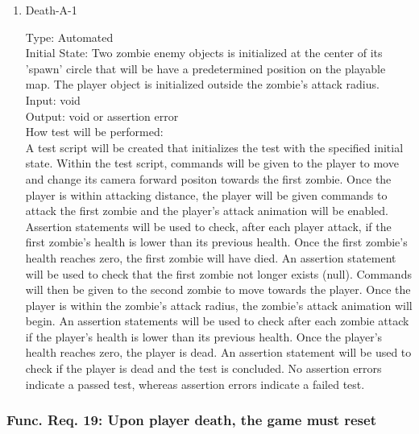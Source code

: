 \documentclass[12pt, titlepage]{article}
\begin{document}
\begin{enumerate}

\item{Death-A-1\\}

Type: Automated \\
					
Initial State: Two zombie enemy objects is initialized at the center of its 'spawn' circle that will be have a predetermined position on the playable map. The player object is initialized outside the zombie's attack radius.\\
					
Input: void \\
					
Output: void or assertion error \\
					
How test will be performed:\\  A test script will be created that initializes the test with the specified initial state. Within the test script, commands will be given to the player to move and change its camera forward positon towards the first zombie. Once the player is within attacking distance, the player will be given commands to attack the first zombie and the player's attack animation will be enabled. Assertion statements will be used to check, after each player attack, if the first zombie's health is lower than its previous health. Once the first zombie's health reaches zero, the first zombie will have died. An assertion statement will be used to check that the first zombie not longer exists (null). Commands will then be given to the second zombie to move towards the player. Once the player is within the zombie's attack radius, the zombie's attack animation will begin.  An assertion statements will be used to check after each zombie attack if the player's health is lower than its previous health. Once the player's health reaches zero, the player is dead. An assertion statement will be used to check if the player is dead and the test is concluded. No assertion errors indicate a passed test, whereas assertion errors indicate a failed test.\\

\end{enumerate}

\subsubsection{Func. Req. 19: Upon player death, the game must reset}
\end{document}
